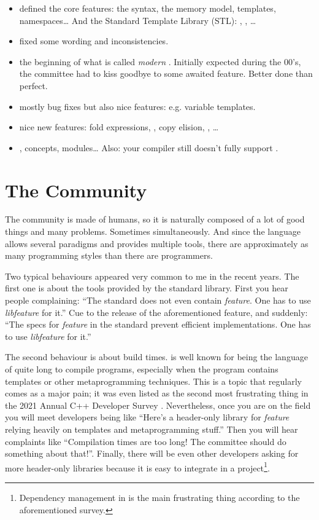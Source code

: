 \begin{itemize}
\item {\bf {}} defined the core features: the syntax, the memory
  model, templates, namespaces… And the Standard Template Library
  (STL): , , …
\item {\bf {}} fixed some wording and inconsistencies.
\item {\bf {}} the beginning of what is called \emph{modern
  \cpp}. Initially expected during the 00's, the committee had to kiss
  goodbye to some awaited feature. Better done than perfect.
\item {\bf {}} mostly bug fixes but also nice features:
  e.g. variable templates.
\item {\bf {}} nice new features: fold expressions, , copy elision, , …
\item {\bf {}} , concepts, modules… Also: your
  compiler still doesn't fully support .
\end{itemize}

\section{The Community}

The \cpp{} community is made of humans, so it is naturally composed of
a lot of good things and many problems. Sometimes simultaneously. And
since the language allows several paradigms and provides multiple
tools, there are approximately as many programming styles than there
are \cpp{} programmers.

Two typical behaviours appeared very common to me in the recent
years. The first one is about the tools provided by the standard
library. First you hear people complaining: ``The standard does not
even contain {\em feature}. One has to use {\em libfeature} for it.''
Cue to the release of the aforementioned feature, and suddenly: ``The
specs for {\em feature} in the standard prevent efficient
implementations. One has to use {\em libfeature} for it.''

The second behaviour is about build times. \Cpp{} is well known for
being the language of quite long to compile programs, especially when
the program contains templates or other metaprogramming
techniques. This is a topic that regularly comes as a major pain; it
was even listed as the second most frustrating thing in the 2021
Annual C++ Developer Survey
\cite{2021-annual-cpp-developer-survey}. Nevertheless, once you are on
the field you will meet developers being like ``Here's a header-only
library for {\em feature} relying heavily on templates and
metaprogramming stuff.'' Then you will hear complaints like
``Compilation times are too long!  The committee should do something
about that!''. Finally, there will be even other developers asking for
more header-only libraries because it is easy to integrate in a
project\footnote{Dependency management in \cpp{} is the main
  frustrating thing according to the aforementioned survey.}.

